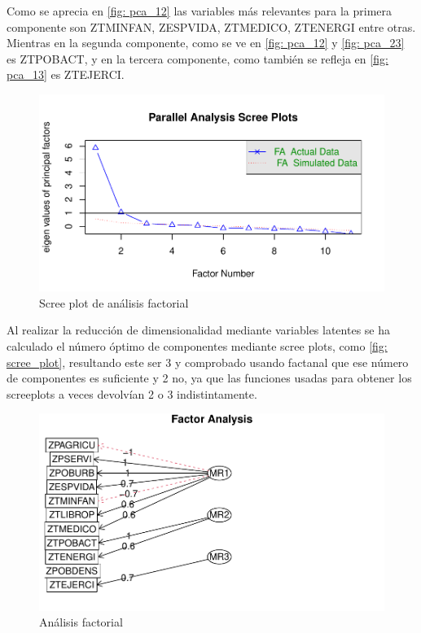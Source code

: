 \documentclass[twoside,openright,titlepage,numbers=noenddot,openany,headinclude,footinclude=true,
cleardoublepage=empty,abstractoff,BCOR=5mm,paper=a4,fontsize=12pt,main=spanish]{scrreprt}
\begin{document}
Como se aprecia en \eqref{fig: pca_12} las variables más relevantes para la primera componente son ZTMINFAN, ZESPVIDA, ZTMEDICO, ZTENERGI entre otras. Mientras en la segunda componente, como se ve en \eqref{fig: pca_12} y \eqref{fig: pca_23} es ZTPOBACT, y en la tercera componente, como también se refleja en \eqref{fig: pca_13} es ZTEJERCI.

\begin{figure}[H]
\includegraphics[scale=1]{scree_plot.pdf}
\caption{Scree plot de análisis factorial}
\label{fig: scree_plot}
\end{figure}

Al realizar la reducción de dimensionalidad mediante variables latentes se ha calculado el número óptimo de componentes mediante scree plots, como \eqref{fig: scree_plot}, resultando este ser 3 y comprobado usando factanal que ese número de componentes es suficiente y 2 no, ya que las funciones usadas para obtener los screeplots a veces devolvían 2 o 3 indistintamente.

\begin{figure}[H]
\includegraphics[scale=1]{analisis_factorial.pdf}
\caption{Análisis factorial}
\label{fig: analisis_factorial}
\end{figure}
\end{document}
